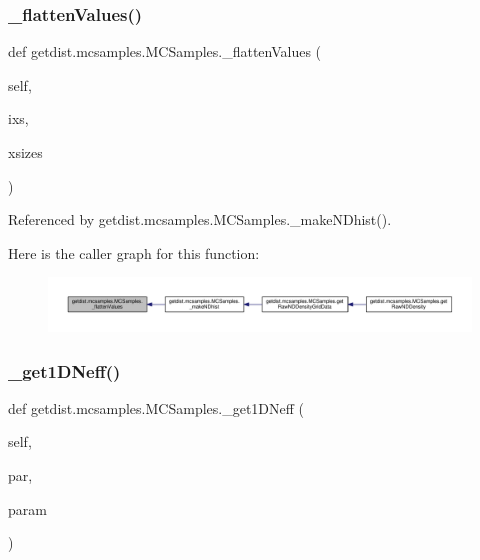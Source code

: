 \subsubsection{\texorpdfstring{\+\_\+flatten\+Values()}{\_flattenValues()}}
{\footnotesize\ttfamily def getdist.\+mcsamples.\+M\+C\+Samples.\+\_\+flatten\+Values (\begin{DoxyParamCaption}\item[{}]{self,  }\item[{}]{ixs,  }\item[{}]{xsizes }\end{DoxyParamCaption})\hspace{0.3cm}{\ttfamily [private]}}



Referenced by getdist.\+mcsamples.\+M\+C\+Samples.\+\_\+make\+N\+Dhist().

Here is the caller graph for this function\+:
\nopagebreak
\begin{figure}[H]
\begin{center}
\leavevmode
\includegraphics[width=350pt]{classgetdist_1_1mcsamples_1_1MCSamples_a467ece66c344e1e7d4e68f44ea0812f1_icgraph}
\end{center}
\end{figure}
\mbox{\label{classgetdist_1_1mcsamples_1_1MCSamples_ab2849686882a2194c2e3c67e722cde18}} 
\subsubsection{\texorpdfstring{\+\_\+get1\+D\+Neff()}{\_get1DNeff()}}
{\footnotesize\ttfamily def getdist.\+mcsamples.\+M\+C\+Samples.\+\_\+get1\+D\+Neff (\begin{DoxyParamCaption}\item[{}]{self,  }\item[{}]{par,  }\item[{}]{param }\end{DoxyParamCaption})\hspace{0.3cm}{\ttfamily [private]}}



